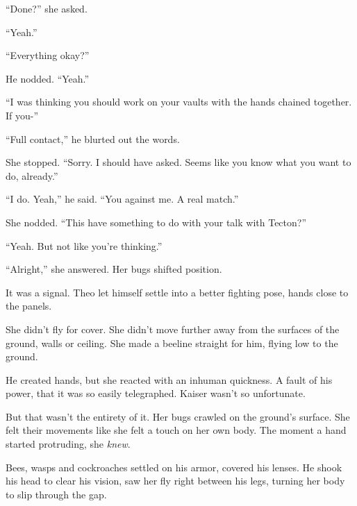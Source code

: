 ``Done?'' she asked.



``Yeah.''



``Everything okay?''



He nodded.  ``Yeah.''



``I was thinking you should work on your vaults with the hands chained together.  If you-''



``Full contact,'' he blurted out the words.



She stopped.  ``Sorry.  I should have asked.  Seems like you know what you want to do, already.''



``I do.  Yeah,'' he said.  ``You against me.  A real match.''



She nodded.  ``This have something to do with your talk with Tecton?''



``Yeah.  But not like you're thinking.''



``Alright,'' she answered.  Her bugs shifted position.



It was a signal.  Theo let himself settle into a better fighting pose, hands close to the panels.



She didn't fly for cover.  She didn't move further away from the surfaces of the ground, walls or ceiling.  She made a beeline straight for him, flying low to the ground.



He created hands, but she reacted with an inhuman quickness.  A fault of his power, that it was so easily telegraphed.  Kaiser wasn't so unfortunate.



But that wasn't the entirety of it.  Her bugs crawled on the ground's surface.  She felt their movements like she felt a touch on her own body.  The moment a hand started protruding, she \emph{knew}.



Bees, wasps and cockroaches settled on his armor, covered his lenses.  He shook his head to clear his vision, saw her fly right between his legs, turning her body to slip through the gap.



